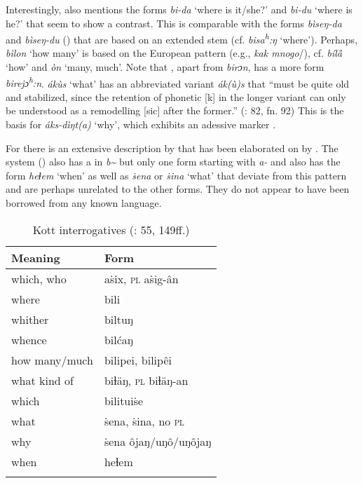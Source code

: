 Interestingly, \citet[226]{Werner1997b} also mentions the  forms \textit{bi-da} ‘where is it/she?’ and \textit{bi-du} ‘where is he?’ that seem to show a  contrast. This is comparable with the  forms \textit{bìseŋ-da} and \textit{bìseŋ-du} () that are based on an extended stem (cf.  \textit{bisa\textsuperscript{h}}\textit{:ŋ} ‘where’). Perhaps,  \textit{bìlon} ‘how many’ is based on the European pattern (e.g.,  \textit{kak mnogo}/), cf.  \textit{bílȁ} ‘how’ and \textit{òn} ‘many, much’. Note that , apart from \textit{birɔn}, has a more  form \textit{birejɔ\textsuperscript{h}}\textit{:n}.  \textit{ákùs} ‘what’ has an abbreviated variant \textit{ák(ù)s} that “must be quite old and stabilized, since the retention of phonetic [k] in the longer variant can only be understood as a remodelling [sic] after the former.” (\citealt{Georg2007}: 82, fn. 92) This is the basis for \textit{áks-dìŋt(a)} ‘why’, which exhibits an adessive marker \citep[166]{Georg2007}.

For  there is an extensive description by \cite{Castrén1858} that has been elaborated on by \citet{Werner1997c}. The   system () also has a  in \textit{b{\textasciitilde}} but only one form starting with \textit{a-} and also has the form \textit{heɫem} ‘when’ as well as \textit{ṡena} or \textit{ṡina} ‘what’ that deviate from this pattern and are perhaps unrelated to the other forms. They do not appear to have been borrowed from any known language.

\begin{table}
\caption{Kott interrogatives (\citealt{Castrén1858}: 55, 149ff.)}
\label{tab:yeni:4}

\begin{tabularx}{\textwidth}{XX}
\lsptoprule

\textbf{Meaning} & \textbf{Form}\\
\midrule
which, who & aṡix, \textsc{pl} aṡig-ân\\
where & bili\\
whither & biltuŋ\\
whence & bilćaŋ\\
how many/much & bilipei, bilipêi\\
what kind of & biɫäŋ, \textsc{pl} biɫäŋ-an\\
which & bilituiṡe\\
what & ṡena, ṡina, no \textsc{pl}\\
why & ṡena ôjaŋ/uŋô/uŋôjaŋ\\
when & heɫem\\
\lspbottomrule
\end{tabularx}
\end{table}

